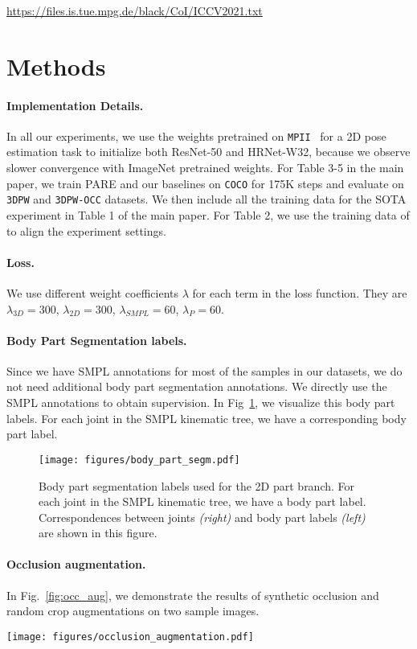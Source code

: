 \documentclass[10pt,twocolumn,letterpaper,usenames,dvipsnames]{article}
\newcommand{\mpii}{\texttt{MPII}\xspace}
\newcommand{\threedpw}{\texttt{3DPW}\xspace}
\newcommand{\threedpwocc}{\texttt{3DPW-OCC}\xspace}
\newcommand{\coco}{\texttt{COCO}\xspace}
\begin{document}
 \url{https://files.is.tue.mpg.de/black/CoI/ICCV2021.txt} \section{Methods}
\paragraph{Implementation Details.}
In all our experiments, we use the weights pretrained on \mpii~\cite{mpii} for a 2D pose estimation task to initialize both ResNet-50 and HRNet-W32, because we observe slower convergence with ImageNet pretrained weights. 
For Table 3-5 in the main paper, we train PARE and our baselines on \coco for 175K steps and evaluate on \threedpw and \threedpwocc datasets. We then include all the training data for the SOTA experiment in Table 1 of the main paper. 
For Table 2, we use the training data of \cite{zhangoohcvpr20} to align the experiment settings.

\paragraph{Loss.}
We use different weight coefficients $\lambda$ for each term in the loss function. They are $\lambda_{3D}=300$, $\lambda_{2D}=300$, $\lambda_{SMPL}=60$, $\lambda_P=60$.

\paragraph{Body Part Segmentation labels.}
Since we have SMPL annotations for most of the samples in our datasets, we do not need additional body part segmentation annotations. We directly use the SMPL annotations to obtain supervision. In Fig~\ref{fig:segmentation}, we visualize this body part labels. For each joint in the SMPL kinematic tree, we have a corresponding body part label.

\begin{figure}[t]
	\centering
	\texttt{[image: figures/body\_part\_segm.pdf]}
\caption{Body part segmentation labels used for the 2D part branch. For each joint in the SMPL kinematic tree, we have a body part label. Correspondences between joints \textit{(right)} and body part labels \textit{(left)} are shown in this figure.}
	\label{fig:segmentation}
\end{figure}{}

\paragraph{Occlusion augmentation.}
In Fig.~\ref{fig:occ_aug}, we demonstrate the results of synthetic occlusion and random crop augmentations on two sample images. 
\begin{figure*}[t]
	\centering
	\texttt{[image: figures/occlusion\_augmentation.pdf]}
	\caption{Training samples after synthetic occlusion and random crop augmentations are applied.}
	\label{fig:occ_aug}
\end{figure*}{}
\end{document}
